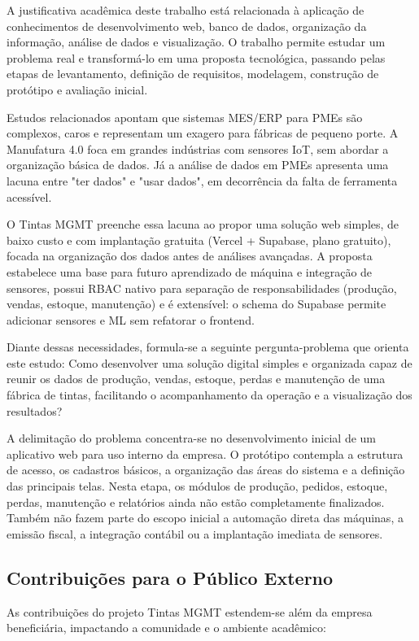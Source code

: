 \documentclass[12pt,a4paper]{article}
\begin{document}
A justificativa acadêmica deste trabalho está relacionada à aplicação de conhecimentos de desenvolvimento web, banco de dados, organização da informação, análise de dados e visualização. O trabalho permite estudar um problema real e transformá-lo em uma proposta tecnológica, passando pelas etapas de levantamento, definição de requisitos, modelagem, construção de protótipo e avaliação inicial.

Estudos relacionados apontam que sistemas MES/ERP para PMEs são complexos, caros e representam um exagero para fábricas de pequeno porte. A Manufatura 4.0 foca em grandes indústrias com sensores IoT, sem abordar a organização básica de dados. Já a análise de dados em PMEs apresenta uma lacuna entre "ter dados" e "usar dados", em decorrência da falta de ferramenta acessível.

O Tintas MGMT preenche essa lacuna ao propor uma solução web simples, de baixo custo e com implantação gratuita (Vercel + Supabase, plano gratuito), focada na organização dos dados antes de análises avançadas. A proposta estabelece uma base para futuro aprendizado de máquina e integração de sensores, possui RBAC nativo para separação de responsabilidades (produção, vendas, estoque, manutenção) e é extensível: o schema do Supabase permite adicionar sensores e ML sem refatorar o frontend.

Diante dessas necessidades, formula-se a seguinte pergunta-problema que orienta este estudo: Como desenvolver uma solução digital simples e organizada capaz de reunir os dados de produção, vendas, estoque, perdas e manutenção de uma fábrica de tintas, facilitando o acompanhamento da operação e a visualização dos resultados?

A delimitação do problema concentra-se no desenvolvimento inicial de um aplicativo web para uso interno da empresa. O protótipo contempla a estrutura de acesso, os cadastros básicos, a organização das áreas do sistema e a definição das principais telas. Nesta etapa, os módulos de produção, pedidos, estoque, perdas, manutenção e relatórios ainda não estão completamente finalizados. Também não fazem parte do escopo inicial a automação direta das máquinas, a emissão fiscal, a integração contábil ou a implantação imediata de sensores.

\subsection{Contribuições para o Público Externo}
As contribuições do projeto Tintas MGMT estendem-se além da empresa beneficiária, impactando a comunidade e o ambiente acadêmico:
\end{document}
